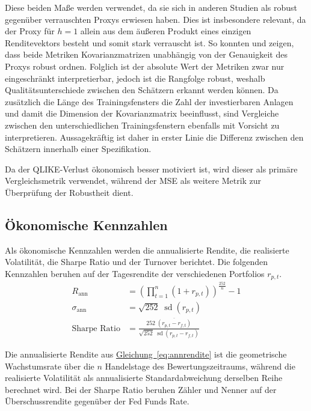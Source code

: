 \documentclass[a4paper, 12pt]{article}
\begin{document}
Diese beiden Maße werden verwendet, da sie sich in anderen Studien als robust gegenüber verrauschten Proxys erwiesen haben.
Dies ist insbesondere relevant, da der Proxy für $h=1$ allein aus dem äußeren Produkt eines einzigen Renditevektors besteht und somit stark verrauscht ist.
So konnten \textcite{patton2011} und \textcite{laurent2013} zeigen, dass beide Metriken Kovarianzmatrizen unabhängig von der Genauigkeit des Proxys robust ordnen.
Folglich ist der absolute Wert der Metriken zwar nur eingeschränkt interpretierbar, jedoch ist die Rangfolge robust, weshalb Qualitätsunterschiede zwischen den Schätzern erkannt werden können.
Da zusätzlich die Länge des Trainingsfensters die Zahl der investierbaren Anlagen und damit die Dimension der Kovarianzmatrix beeinflusst, sind Vergleiche zwischen den unterschiedlichen Trainingsfenstern ebenfalls mit Vorsicht zu interpretieren.
Aussagekräftig ist daher in erster Linie die Differenz zwischen den Schätzern innerhalb einer Spezifikation.

Da der QLIKE-Verlust ökonomisch besser motiviert ist, wird dieser als primäre Vergleichsmetrik verwendet, während der MSE als weitere Metrik zur Überprüfung der Robustheit dient.

\subsection{Ökonomische Kennzahlen}
Als ökonomische Kennzahlen werden die annualisierte Rendite, die realisierte Volatilität, die Sharpe Ratio und der Turnover berichtet.
Die folgenden Kennzahlen beruhen auf der Tagesrendite der verschiedenen Portfolios $r_{p,t}$.
\begin{align}
	\label{eq:annrendite}
	R_{\mathrm{ann}} &= \left(\prod_{t=1}^{n}\left(1 + r_{p,t}\right)\right)^{\frac{252}{n}} - 1 \\
	\label{eq:annvola}
	\sigma_{\mathrm{ann}} &= \sqrt{252}\;\operatorname{sd}\left(r_{p,t}\right) \\
	\label{eq:sharpe}
	\text{Sharpe Ratio} &=\frac{252\;\overline{\left(r_{p,t} - r_{f,t}\right)}}{\sqrt{252}\;\operatorname{sd}\left(r_{p,t} - r_{f,t}\right)}
\end{align}

Die annualisierte Rendite aus \hyperref[eq:annrendite]{Gleichung~\ref*{eq:annrendite}} ist die geometrische Wachstumsrate über die $n$ Handelstage des Bewertungszeitraums, während die realisierte Volatilität als annualisierte Standardabweichung derselben Reihe berechnet wird.
Bei der Sharpe Ratio beruhen Zähler und Nenner auf der Überschussrendite gegenüber der Fed Funds Rate.
\end{document}
